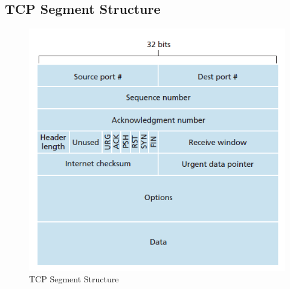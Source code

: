 \documentclass{article}
\theoremstyle{plain}
\theoremstyle{definition}
\begin{document}
\subsection{TCP Segment Structure}
\begin{figure}[!h]
    \centering
    \includegraphics[scale=0.7]{cn3.png}
    \caption{TCP Segment Structure}
    \label{fig:my_label_11}
\end{figure}
\end{document}
